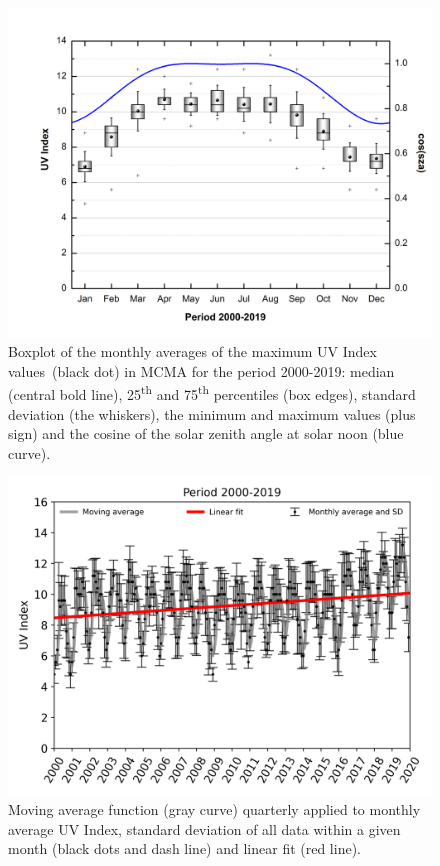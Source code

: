 \documentclass[10pt]{article}
\begin{document}
\par\null{}
\begin{figure}[H]
  \begin{center}
    \includegraphics[width=0.70\columnwidth]{figures/Boxplotcos}
    \caption{{Boxplot of the monthly averages of the maximum UV Index values~(black
          dot) in MCMA for the period 2000-2019: median (central bold line),
          25\textsuperscript{th} and 75\textsuperscript{th} percentiles (box
          edges), standard deviation (the whiskers), the minimum and maximum
          values (plus sign) and the cosine of the solar zenith angle at solar
          noon (blue curve).
            {\label{310112}}%
        }}
  \end{center}
\end{figure}
\begin{figure}[H]
  \begin{center}
    \includegraphics[width=0.70\columnwidth]{figures/UV_Moving_Average}
    \caption{{Moving average function (gray curve) quarterly applied to monthly
          average UV Index, standard deviation of all data within a given month
          (black dots and dash line) and linear fit (red line).
            {\label{185758}}%
        }}
  \end{center}
\end{figure}
\end{document}
